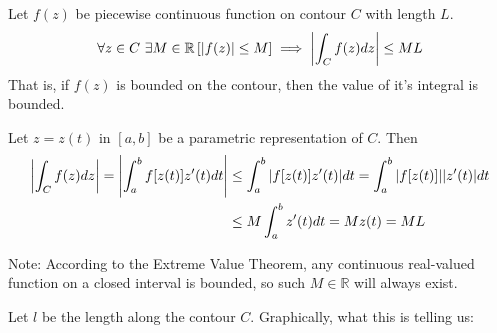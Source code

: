 \documentclass[12pt, english]{book}
\makeatletter
\renewenvironment{proof}[1][\proofname]{\par
	\pushQED{\qed}%
	\normalfont \topsep6\p@\@plus6\p@\relax
	\list{}{%
		\settowidth{\leftmargin}{\itshape\proofname:\hskip\labelsep}%
		\setlength{\labelwidth}{0pt}%
		\setlength{\itemindent}{-\leftmargin}%
	}%
	\item[\hskip\labelsep\itshape#1\@addpunct{:}]\ignorespaces
}{%
	\popQED\endlist\@endpefalse
}
\makeatother
\begin{document}
	\begin{theorem}
		Let \(f(z)\) be piecewise continuous function on contour \(C\) with length \(L\).
		\begin{align*}
			\forall z \in C \ \exists M \in \mathbb{R} 
			\left[\abs{f(z)} \leq M \right] \implies \abs{\int_{C} f(z) dz} \leq ML 
		\end{align*}
		That is, if \(f(z)\) is bounded on the contour, then the value of it's integral is bounded. 
	\end{theorem}
	\begin{proof}
		Let \(z = z(t)\) in \([a, b]\) be a parametric representation of \(C\). Then
		\begin{align*}
			\abs{\int_{C} f(z) dz} = \abs{\int_{a}^{b} f[z(t)] z'(t) dt} 
			&\leq \int_{a}^{b} \abs{f[z(t)] z'(t)} dt = \int_{a}^{b}  \abs{f[z(t)]} \abs{z'(t)} dt  \\
			&\leq M \int_{a}^{b} z'(t) dt = M z(t) = ML
		\end{align*}
	\end{proof}

	Note: According to the Extreme Value Theorem, any continuous real-valued function on a closed interval is bounded, so such \(M \in \mathbb{R}\) will always exist. 
	
	\begin{observation}
		Let \(l\) be the length along the contour \(C\). Graphically, what this is telling us:
		\begin{figure}[H]
			\centering
		\end{figure}
	\end{observation}
\end{document}
